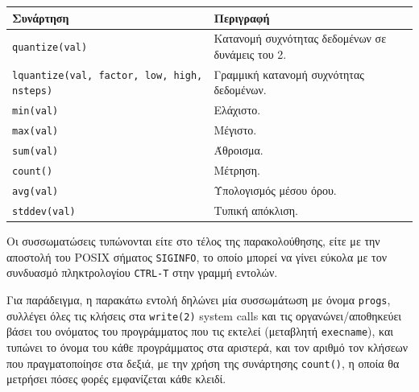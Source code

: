 \documentclass[12pt]{article}
\begin{document}
\begin{center}
\begin{tabular}{|p{9cm}|p{9cm}|}
	\hline
	\textbf{Συνάρτηση} & \textbf{Περιγραφή} \\
	\hline
	\lstinline{quantize(val)} & Κατανομή συχνότητας δεδομένων σε δυνάμεις του 2. \\
	\hline
	\lstinline{lquantize(val, factor, low, high, nsteps)} & Γραμμική
		κατανομή συχνότητας δεδομένων. \\
	\hline
	\lstinline{min(val)} & Ελάχιστο. \\
	\hline
	\lstinline{max(val)} & Μέγιστο. \\
	\hline
	\lstinline{sum(val)} & Άθροισμα. \\
	\hline
	\lstinline{count()} & Μέτρηση. \\
	\hline
	\lstinline{avg(val)} & Υπολογισμός μέσου όρου. \\
	\hline
	\lstinline{stddev(val)} & Τυπική απόκλιση. \\
	\hline
\end{tabular}
\end{center}

Οι συσσωματώσεις τυπώνονται είτε στο τέλος της παρακολούθησης, είτε με την
αποστολή του POSIX σήματος \lstinline{SIGINFO}, το οποίο μπορεί να γίνει εύκολα
με τον συνδυασμό πληκτρολογίου \lstinline{CTRL-T} στην γραμμή εντολών.

Για παράδειγμα, η παρακάτω εντολή δηλώνει μία συσσωμάτωση με όνομα
\lstinline{progs}, συλλέγει όλες τις κλήσεις στα \lstinline{write(2)} system
calls και τις οργανώνει/αποθηκεύει βάσει του ονόματος του προγράμματος που τις
εκτελεί (μεταβλητή \lstinline{execname}), και τυπώνει το όνομα του κάθε
προγράμματος στα αριστερά, και τον αριθμό τον κλήσεων που πραγματοποίησε στα
δεξιά, με την χρήση της συνάρτησης \lstinline{count()}, η οποία θα μετρήσει
πόσες φορές εμφανίζεται κάθε κλειδί.
\end{document}
